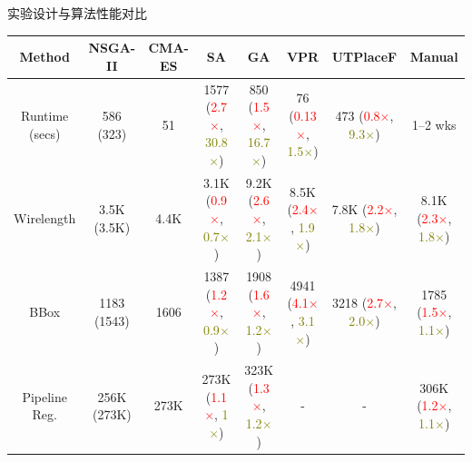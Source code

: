 \documentclass[10pt]{beamer}
\begin{document}
\begin{frame}{实验设计与算法性能对比}
  \vspace{-1.0cm}

  \begin{table}
      \label{table:comparison}
      \centering
      \begin{adjustbox}{width=1.1\textwidth,center}
      \begin{tabular}{c|c c| c c c c c}
      \toprule
      Method             & NSGA-II    	          & CMA-ES       & SA 					                                                                       & GA 			                                                                  & VPR     	                                                                & UTPlaceF 		                                                                   &  Manual \\
      \midrule
      Runtime (secs)     & 586 (323)		          & 51  		     &1577     (\textcolor{red}{2.7$\times$}, \textcolor{olive}{30.8$\times$})		        & 850 (\textcolor{red}{1.5$\times$}, \textcolor{olive}{16.7$\times$})		      & 76 (\textcolor{red}{0.13$\times$}, \textcolor{olive}{1.5$\times$})		    &  473 (\textcolor{red}{0.8$\times$}, \textcolor{olive}{9.3$\times$})            & 1--2 wks\\
      Wirelength  	     & 3.5K  (3.5K)   		    & 4.4K     		 &3.1K 	   (\textcolor{red}{0.9$\times$}, \textcolor{olive}{0.7$\times$})		          & 9.2K  (\textcolor{red}{2.6$\times$}, \textcolor{olive}{2.1$\times$})    		& 8.5K (\textcolor{red}{2.4$\times$}, \textcolor{olive}{1.9$\times$})   		&  7.8K  (\textcolor{red}{2.2$\times$}, \textcolor{olive}{1.8$\times$})          & 8.1K (\textcolor{red}{2.3$\times$}, \textcolor{olive}{1.8$\times$})  \\
      BBox      	       & 1183  (1543)   		    & 1606     		 &1387	   (\textcolor{red}{1.2$\times$}, \textcolor{olive}{0.9$\times$})		          & 1908  (\textcolor{red}{1.6$\times$}, \textcolor{olive}{1.2$\times$})   		  & 4941	(\textcolor{red}{4.1$\times$}, \textcolor{olive}{3.1$\times$})  		&   3218	(\textcolor{red}{2.7$\times$}, \textcolor{olive}{2.0$\times$})         & 1785 (\textcolor{red}{1.5$\times$}, \textcolor{olive}{1.1$\times$})  \\
      Pipeline Reg.		   & 256K  (273K) 		      & 273K	   		 &273K	   (\textcolor{red}{1.1$\times$}, \textcolor{olive}{1$\times$}) 	 	          & 323K	(\textcolor{red}{1.3$\times$}, \textcolor{olive}{1.2$\times$})   		  & -		                                                                      &   -                                                                            & 306K (\textcolor{red}{1.2$\times$}, \textcolor{olive}{1.1$\times$})   \\

\end{tabular}
\end{adjustbox}
\end{table}
\end{frame}
\end{document}
